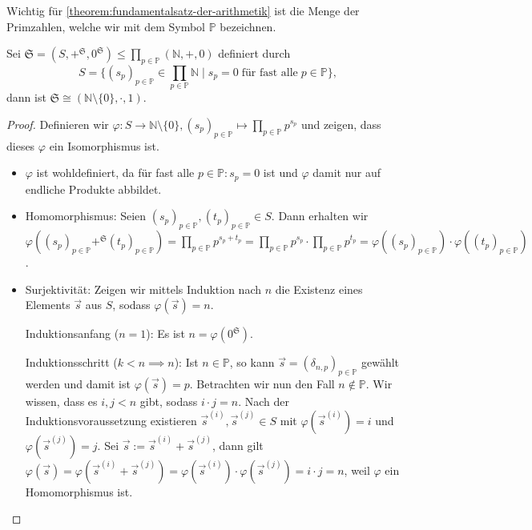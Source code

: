 Wichtig für \cref{theorem:fundamentalsatz-der-arithmetik} ist die Menge der Primzahlen, welche wir mit dem Symbol $\mathbb{P}$ bezeichnen.

\begin{theorem}\label{theorem:fundamentalsatz-der-arithmetik}
    Sei $\mathfrak{S} = (S, +^{\mathfrak{S}}, 0^{\mathfrak{S}}) \le \prod_{p \in \mathbb{P}} (\mathbb{N}, +, 0)$ definiert durch
    $$ S = \{(s_p)_{p \in \mathbb{P}} \in \prod_{p \in \mathbb{P}} \mathbb{N} \mid s_p = 0 \;\text{für fast alle}\; p \in \mathbb{P}\}, $$
    dann ist $\mathfrak{S} \cong (\mathbb{N}\setminus\{0\}, \cdot, 1)$.
\end{theorem}

\begin{proof} Definieren wir $\varphi: S \to \mathbb{N}\setminus\{0\}, (s_p)_{p \in \mathbb{P}} \mapsto \prod_{p \in \mathbb{P}} p^{s_p}$ und zeigen, dass dieses $\varphi$ ein Isomorphismus ist.
    \begin{itemize}
        \item $\varphi$ ist wohldefiniert, da für fast alle $p \in \mathbb{P}: s_p = 0$ ist und $\varphi$ damit nur auf endliche Produkte abbildet.
        
        \item Homomorphismus: Seien $(s_p)_{p\in\mathbb{P}}, (t_p)_{p\in\mathbb{P}} \in S$. Dann erhalten wir $\varphi((s_p)_{p\in\mathbb{P}} +^\mathfrak{S} (t_p)_{p\in\mathbb{P}}) = \prod_{p\in\mathbb{P}} p^{s_p + t_p} = \prod_{p\in\mathbb{P}} p^{s_p} \cdot \prod_{p\in\mathbb{P}} p^{t_p}=\varphi((s_p)_{p\in\mathbb{P}})\cdot\varphi((t_p)_{p\in\mathbb{P}})$.
        
        \item Surjektivität: Zeigen wir mittels Induktion nach $n$ die Existenz eines Elements $\vec{s}$ aus $S$, sodass $\varphi(\vec{s}) = n$.
        
        Induktionsanfang ($n=1$): Es ist $n = \varphi(0^\mathfrak{S})$.

        Induktionsschritt ($k<n \implies n$): Ist $n \in \mathbb{P}$, so kann $\vec{s} = (\delta_{n,p})_{p \in \mathbb{P}}$ gewählt werden und damit ist $\varphi(\vec{s}) = p$. Betrachten wir nun den Fall $n \not\in \mathbb{P}$. Wir wissen, dass es $i, j < n$ gibt, sodass $i \cdot j = n$. Nach der Induktionsvoraussetzung existieren $\vec s^{(i)}, \vec s^{(j)} \in S$ mit $\varphi(\vec s^{(i)}) = i$ und $\varphi(\vec s^{(j)}) = j$. Sei $\vec s := \vec s^{(i)} + \vec s^{(j)}$, dann gilt $\varphi(\vec s) = \varphi(\vec s^{(i)} + \vec s^{(j)}) = \varphi(\vec s^{(i)}) \cdot \varphi(\vec s^{(j)}) = i \cdot j = n$, weil $\varphi$ ein Homomorphismus ist.


\end{itemize}
\end{proof}

